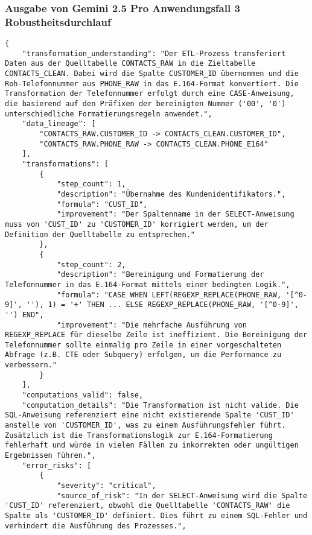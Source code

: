 \subsubsection{Ausgabe von Gemini 2.5 Pro Anwendungsfall 3 Robustheitsdurchlauf}\label{anhang:subsubsec:gemini_case3_prompt3}
\begin{lstlisting}[caption={Ausgabe: Gemini 2.5 Pro Anwendungsfall 3 Robustheitsdurchlauf},label={gemini_case3_prompt3}]
{
    "transformation_understanding": "Der ETL-Prozess transferiert Daten aus der Quelltabelle CONTACTS_RAW in die Zieltabelle CONTACTS_CLEAN. Dabei wird die Spalte CUSTOMER_ID übernommen und die Roh-Telefonnummer aus PHONE_RAW in das E.164-Format konvertiert. Die Transformation der Telefonnummer erfolgt durch eine CASE-Anweisung, die basierend auf den Präfixen der bereinigten Nummer ('00', '0') unterschiedliche Formatierungsregeln anwendet.",
    "data_lineage": [
        "CONTACTS_RAW.CUSTOMER_ID -> CONTACTS_CLEAN.CUSTOMER_ID",
        "CONTACTS_RAW.PHONE_RAW -> CONTACTS_CLEAN.PHONE_E164"
    ],
    "transformations": [
        {
            "step_count": 1,
            "description": "Übernahme des Kundenidentifikators.",
            "formula": "CUST_ID",
            "improvement": "Der Spaltenname in der SELECT-Anweisung muss von 'CUST_ID' zu 'CUSTOMER_ID' korrigiert werden, um der Definition der Quelltabelle zu entsprechen."
        },
        {
            "step_count": 2,
            "description": "Bereinigung und Formatierung der Telefonnummer in das E.164-Format mittels einer bedingten Logik.",
            "formula": "CASE WHEN LEFT(REGEXP_REPLACE(PHONE_RAW, '[^0-9]', ''), 1) = '+' THEN ... ELSE REGEXP_REPLACE(PHONE_RAW, '[^0-9]', '') END",
            "improvement": "Die mehrfache Ausführung von REGEXP_REPLACE für dieselbe Zeile ist ineffizient. Die Bereinigung der Telefonnummer sollte einmalig pro Zeile in einer vorgeschalteten Abfrage (z.B. CTE oder Subquery) erfolgen, um die Performance zu verbessern."
        }
    ],
    "computations_valid": false,
    "computation_details": "Die Transformation ist nicht valide. Die SQL-Anweisung referenziert eine nicht existierende Spalte 'CUST_ID' anstelle von 'CUSTOMER_ID', was zu einem Ausführungsfehler führt. Zusätzlich ist die Transformationslogik zur E.164-Formatierung fehlerhaft und würde in vielen Fällen zu inkorrekten oder ungültigen Ergebnissen führen.",
    "error_risks": [
        {
            "severity": "critical",
            "source_of_risk": "In der SELECT-Anweisung wird die Spalte 'CUST_ID' referenziert, obwohl die Quelltabelle 'CONTACTS_RAW' die Spalte als 'CUSTOMER_ID' definiert. Dies führt zu einem SQL-Fehler und verhindert die Ausführung des Prozesses.",

\end{lstlisting}
